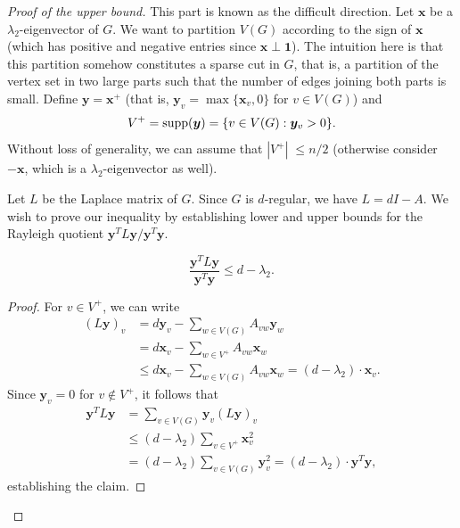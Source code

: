\begin{proof}[Proof of the upper bound]
    This part is known as the difficult direction. 
    Let $\bm{x}$ be a $\lambda_2$-eigenvector of $G$. 
    We want to partition $V(G)$ according to the sign of $\bm{x}$ (which has positive and negative entries since $\bm{x} \perp \bm{1}$).
    The intuition here is that this partition somehow constitutes a sparse cut in $G$, that is, a partition of the vertex set in two large parts such that the number of edges joining both parts is small.
    Define $\bm{y} = \bm{x}^{+}$ (that is, $\bm{y}_v = \max \{ \bm{x}_v, 0 \}$ for $v \in V(G)$) and 
    \begin{equation*}
        V^{+} = \operatorname{supp}(\bm{y}) = \{ v \in V(G) : \bm{y}_v > 0 \}.
    \end{equation*}
    Without loss of generality, we can assume that $|V^+|\; \le n/2$ (otherwise consider $-\bm{x}$, which is a $\lambda_2$-eigenvector as well).

    Let $L$ be the Laplace matrix of $G$. Since $G$ is $d$-regular, we have $L = dI - A$.
    We wish to prove our inequality by establishing lower and upper bounds for the Rayleigh quotient $\bm{y}^T L \bm{y}/\bm{y}^T \bm{y}$.

    \begin{claim}
        \begin{equation*}
            \frac{\bm{y}^T L \bm{y}}{\bm{y}^T \bm{y}} \le d - \lambda_2.
        \end{equation*}
    \end{claim}
    
    \begin{proof}
        For $v \in V^+$, we can write
        \begin{align*}
            (L\bm{y})_v &= d \bm{y}_v - \sum \limits_{w \in V(G)} A_{vw} \bm{y}_w \\
                &= d \bm{x}_v - \sum \limits_{w \in V^+} A_{vw} \bm{x}_w \\
                &\le d \bm{x}_v - \sum \limits_{w \in V(G)} A_{vw} \bm{x}_w 
                = (d - \lambda_2) \cdot \bm{x}_v.
        \end{align*}
        Since $\bm{y}_v = 0$ for $v \notin V^+$, it follows that 
        \begin{align*}
            \bm{y}^T L \bm{y} &= \sum \limits_{v \in V(G)} \bm{y}_v (L\bm{y})_v \\
                &\le (d - \lambda_2) \sum \limits_{v \in V^+} \bm{x}_v^2 \\ 
                &= (d - \lambda_2) \sum \limits_{v \in V(G)} \bm{y}_v^2 = (d - \lambda_2) \cdot \bm{y}^T \bm{y},
        \end{align*}
        establishing the claim.
    \end{proof}


\end{proof}

